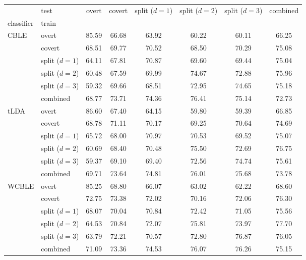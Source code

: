 \begin{tabular}{@{}llcccccc@{}}
\toprule
 & test & overt & covert & split ($d=1$) & split ($d=2$) & split ($d=3$) & combined \\
classifier & train &  &  &  &  &  &  \\
\midrule
\multirow[t]{6}{*}{CBLE} & overt & 85.59 & 66.68 & 63.92 & 60.22 & 60.11 & 66.25 \\
 & covert & 68.51 & 69.77 & 70.52 & 68.50 & 70.29 & 75.08 \\
 & split ($d=1$) & 64.11 & 67.81 & 70.87 & 69.60 & 69.44 & 75.04 \\
 & split ($d=2$) & 60.48 & 67.59 & 69.99 & 74.67 & 72.88 & 75.96 \\
 & split ($d=3$) & 59.32 & 69.66 & 68.51 & 72.95 & 74.65 & 75.18 \\
 & combined & 68.77 & 73.71 & 74.36 & 76.41 & 75.14 & 72.73 \\
\midrule
\multirow[t]{6}{*}{tLDA} & overt & 86.60 & 67.40 & 64.15 & 59.80 & 59.39 & 66.85 \\
 & covert & 68.78 & 71.11 & 70.17 & 69.25 & 70.64 & 74.69 \\
 & split ($d=1$) & 65.72 & 68.00 & 70.97 & 70.53 & 69.52 & 75.07 \\
 & split ($d=2$) & 60.69 & 68.40 & 70.48 & 75.50 & 72.69 & 76.75 \\
 & split ($d=3$) & 59.37 & 69.10 & 69.40 & 72.56 & 74.74 & 75.61 \\
 & combined & 69.71 & 73.64 & 74.81 & 76.01 & 75.68 & 73.78 \\
\midrule
\multirow[t]{6}{*}{WCBLE} & overt & 85.25 & 68.80 & 66.07 & 63.02 & 62.22 & 68.60 \\
 & covert & 72.75 & 73.38 & 72.02 & 70.16 & 72.06 & 76.30 \\
 & split ($d=1$) & 68.07 & 70.04 & 70.84 & 72.42 & 71.05 & 75.56 \\
 & split ($d=2$) & 64.53 & 70.84 & 72.07 & 75.81 & 73.97 & 77.70 \\
 & split ($d=3$) & 63.79 & 72.21 & 70.57 & 72.80 & 76.87 & 76.05 \\
 & combined & 71.09 & 73.36 & 74.53 & 76.07 & 76.26 & 75.15 \\
\bottomrule
\end{tabular}

